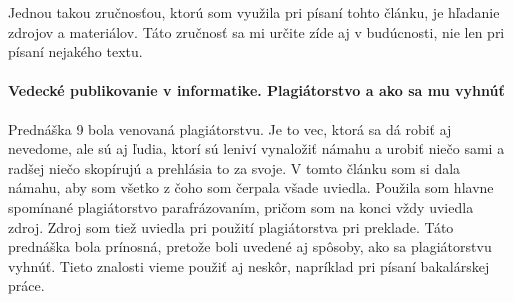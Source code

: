 \documentclass[10pt,twoside,slovak,a4paper]{article}
\begin{document}
Jednou takou zručnosťou, ktorú som využila pri písaní tohto článku, je hľadanie zdrojov a materiálov. Táto zručnosť sa mi určite zíde aj v budúcnosti, nie len pri písaní nejakého textu.


\paragraph{Vedecké publikovanie v informatike. Plagiátorstvo a ako sa mu vyhnúť}
Prednáška 9 bola venovaná plagiátorstvu. Je to vec, ktorá sa dá robiť aj nevedome, ale sú aj ľudia, ktorí sú leniví vynaložiť námahu a urobiť niečo sami a  radšej niečo skopírujú a prehlásia to za svoje. V tomto článku som si dala námahu, aby som všetko z čoho som čerpala všade uviedla. Použila som hlavne spomínané plagiátorstvo parafrázovaním, pričom som na konci vždy uviedla zdroj. Zdroj som tiež uviedla pri použití plagiátorstva pri preklade. Táto prednáška bola prínosná, pretože boli uvedené aj spôsoby, ako sa plagiátorstvu vyhnúť. Tieto znalosti vieme použiť aj neskôr, napríklad pri písaní bakalárskej práce.




%



\end{document}
